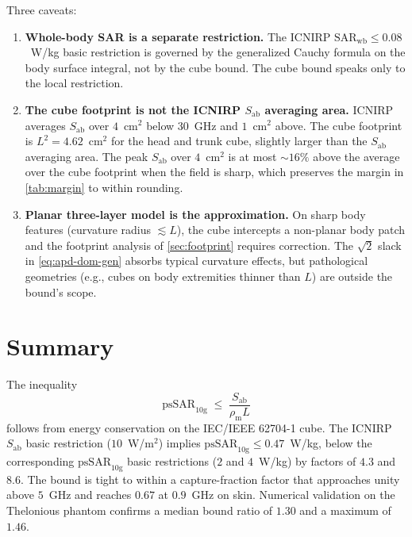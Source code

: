 \documentclass[11pt,a4paper]{article}
\theoremstyle{definition}
\theoremstyle{remark}
\newcommand{\APD}{S_{\mathrm{ab}}}
\newcommand{\psSAR}{\ensuremath{\mathrm{psSAR}_{10\mathrm{g}}}}
\newcommand{\rhom}{\rho_{\mathrm{m}}}
\begin{document}
Three caveats:

\begin{enumerate}\setlength{\itemsep}{4pt}
  \item \textbf{Whole-body SAR is a separate restriction.} The
        ICNIRP $\mathrm{SAR}_{\mathrm{wb}} \le 0.08$~W/kg basic
        restriction is governed by the generalized Cauchy formula on
        the body surface integral, not by the cube bound. The cube
        bound speaks only to the local restriction.

  \item \textbf{The cube footprint is not the ICNIRP $\APD$ averaging
        area.} ICNIRP averages $\APD$ over $4$~cm$^2$ below $30$~GHz
        and $1$~cm$^2$ above. The cube footprint is
        $L^2 = 4.62$~cm$^2$ for the head and trunk cube, slightly
        larger than the $\APD$ averaging area. The peak $\APD$ over
        $4$~cm$^2$ is at most $\sim 16\%$ above the average over the
        cube footprint when the field is sharp, which preserves the
        margin in \cref{tab:margin} to within rounding.

  \item \textbf{Planar three-layer model is the approximation.} On
        sharp body features (curvature radius $\lesssim L$), the
        cube intercepts a non-planar body patch and the footprint
        analysis of \cref{sec:footprint} requires correction. The
        $\sqrt{2}$ slack in \cref{eq:apd-dom-gen} absorbs typical
        curvature effects, but pathological geometries (e.g., cubes
        on body extremities thinner than $L$) are outside the bound's
        scope.
\end{enumerate}

\section{Summary}\label{sec:summary}

The inequality
\begin{equation*}
  \psSAR \;\le\; \frac{\APD}{\rhom L}
\end{equation*}
follows from energy conservation on the IEC/IEEE 62704-1 cube. The
ICNIRP $\APD$ basic restriction ($10$~W/m$^2$) implies
$\psSAR \le 0.47$~W/kg, below the corresponding $\psSAR$ basic
restrictions ($2$ and $4$~W/kg) by factors of $4.3$ and $8.6$. The
bound is tight to within a capture-fraction factor that approaches
unity above $5$~GHz and reaches $0.67$ at $0.9$~GHz on skin. Numerical
validation on the Thelonious phantom confirms a median bound ratio of
$1.30$ and a maximum of $1.46$.
\end{document}

